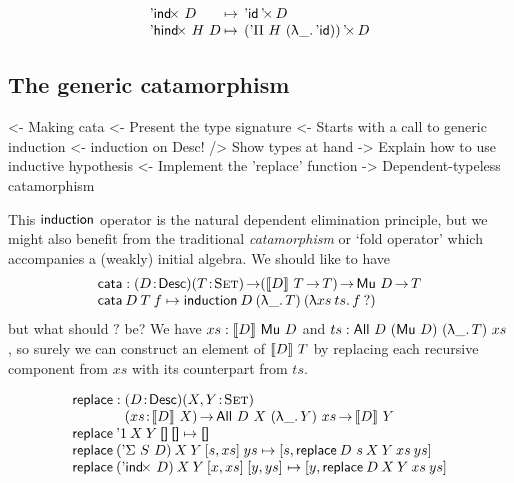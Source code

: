 \[\begin{array}{l@{\:\mapsto\:\:}l}
\DIndx{D}         & \DProd{\DId}{D}                      \\
\DHindx{H}{D}     & \DProd{(\DPi{H}{(\LAM{\_} \DId)})}{D}
\end{array}
\]


\subsection{The generic catamorphism}

\begin{structure}
<- Making cata
    <- Present the type signature
    <- Starts with a call to generic induction
        <- induction on Desc!
        /> Show types at hand
        -> Explain how to use inductive hypothesis
    <- Implement the 'replace' function
    -> Dependent-typeless catamorphism 
\end{structure}

This \(\F{induction}\) operator is the natural dependent elimination
principle, but we might also benefit from the traditional \emph{catamorphism}
or `fold operator' which accompanies a (weakly) initial algebra. We should
like to have
\[\stk{
\F{cata} : \PITEL{D}{\Desc}
           \PI{T}{\Set}
           (\descop{D}{T}\To T) \To 
           \Mu{D} \To T \\
\F{cata}\: D\: T\: f \mapsto
  \F{induction}\: D\: (\LAM{\_}T)\: (\LAM{xs\:ts} f\: ?)
}\]
but what should \(?\) be? We have \(xs:\descop{D}{\Mu{D}}\)
and \(ts:\All{D}{(\Mu{D})}{(\LAM{\_}T)}{xs}\), so surely we can construct
an element of \(\descop{D}{T}\) by replacing each recursive component from
\(xs\) with its counterpart from \(ts\).

\[\stk{
\F{replace} : \stk{\PITEL{D}{\Desc}
                   \PITEL{X,Y}{\Set}\\
                   \PI{xs}{\descop{D}{X}} 
                   \All{D}{X}{(\LAM{\_}Y)}{xs} \To
                   \descop{D}{Y}} \\
\F{replace}\: \DUnit\:          X\: Y\: \Void\:          \Void          \mapsto \Void \\
\F{replace}\: (\DSigma{S}{D})\: X\: Y\: \pair{s}{xs}{}\: ys             \mapsto
    \pair{s}{\F{replace}\: {D~s}\: X\: Y\: xs\: ys}{}         \\
\F{replace}\: (\DIndx{D})\:     X\: Y\: \pair{x}{xs}{}\: \pair{y}{ys}{} \mapsto
    \pair{y}{\F{replace}\: D\: X\: Y\: xs\: ys}{}
}\]



